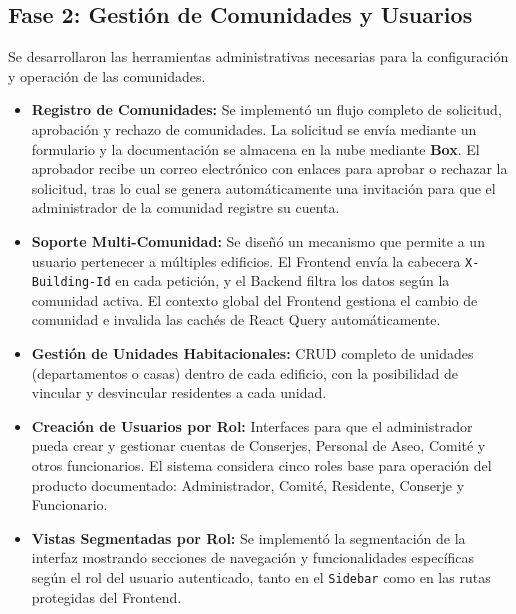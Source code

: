 \subsection{Fase 2: Gestión de Comunidades y Usuarios}
Se desarrollaron las herramientas administrativas necesarias para la configuración y operación de las comunidades.
\begin{itemize}
    \item \textbf{Registro de Comunidades:} Se implementó un flujo completo de solicitud, aprobación y rechazo de comunidades. La solicitud se envía mediante un formulario y la documentación se almacena en la nube mediante \textbf{Box}. El aprobador recibe un correo electrónico con enlaces para aprobar o rechazar la solicitud, tras lo cual se genera automáticamente una invitación para que el administrador de la comunidad registre su cuenta.
    \item \textbf{Soporte Multi-Comunidad:} Se diseñó un mecanismo que permite a un usuario pertenecer a múltiples edificios. El Frontend envía la cabecera \texttt{X-Building-Id} en cada petición, y el Backend filtra los datos según la comunidad activa. El contexto global del Frontend gestiona el cambio de comunidad e invalida las cachés de React Query automáticamente.
    \item \textbf{Gestión de Unidades Habitacionales:} CRUD completo de unidades (departamentos o casas) dentro de cada edificio, con la posibilidad de vincular y desvincular residentes a cada unidad.
    \item \textbf{Creación de Usuarios por Rol:} Interfaces para que el administrador pueda crear y gestionar cuentas de Conserjes, Personal de Aseo, Comité y otros funcionarios. El sistema considera cinco roles base para operación del producto documentado: Administrador, Comité, Residente, Conserje y Funcionario.
    \item \textbf{Vistas Segmentadas por Rol:} Se implementó la segmentación de la interfaz mostrando secciones de navegación y funcionalidades específicas según el rol del usuario autenticado, tanto en el \texttt{Sidebar} como en las rutas protegidas del Frontend.
\end{itemize}

